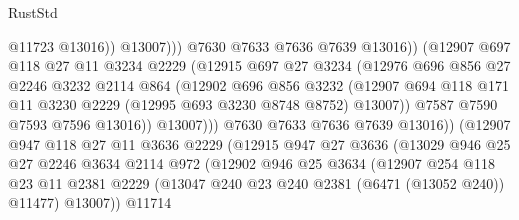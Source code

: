 \begin{lexlean}{RustStd}
\begin{coremodule}
                                    @11723
                                    @13016))
                                @13007)))
                          @7630
                          @7633
                          @7636
                          @7639
                          @13016))
                      (@12907
                        @697
                        @118
                        @27
                        @11
                        @3234
                        @2229
                        (@12915
                          @697
                          @27
                          @3234
                          (@12976
                            @696
                            @856
                            @27
                            @2246
                            @3232
                            @2114
                            @864
                            (@12902
                              @696
                              @856
                              @3232
                              (@12907
                                @694
                                @118
                                @171
                                @11
                                @3230
                                @2229
                                (@12995 @693 @3230 @8748 @8752)
                                @13007))
                            @7587
                            @7590
                            @7593
                            @7596
                            @13016))
                        @13007)))
                  @7630
                  @7633
                  @7636
                  @7639
                  @13016))
              (@12907
                @947
                @118
                @27
                @11
                @3636
                @2229
                (@12915
                  @947
                  @27
                  @3636
                  (@13029
                    @946
                    @25
                    @27
                    @2246
                    @3634
                    @2114
                    @972
                    (@12902
                      @946
                      @25
                      @3634
                      (@12907
                        @254
                        @118
                        @23
                        @11
                        @2381
                        @2229
                        (@13047 @240 @23 @240 @2381 (@6471 (@13052 @240)) @11477)
                        @13007))
                    @11714

\end{coremodule}
\end{lexlean}
